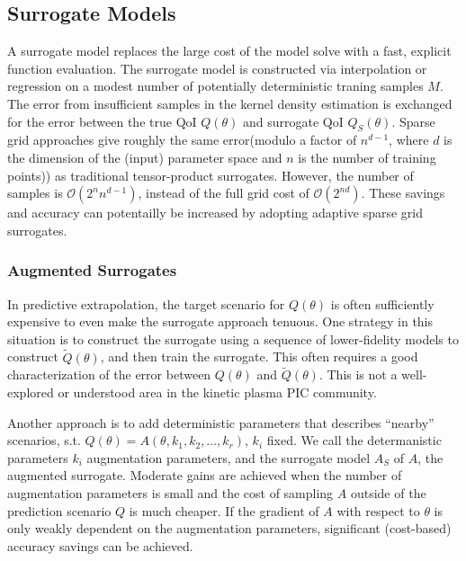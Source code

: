 \documentclass{article}
\begin{document}
\subsection{Surrogate Models}

A surrogate model replaces the large cost of the model solve 
with a fast, explicit function evaluation.  The surrogate model
is constructed via interpolation or regression on a modest number 
of potentially deterministic traning samples $M$.  The
error from insufficient samples in the kernel density estimation is exchanged for the error between the true QoI $Q(\theta)$ and surrogate QoI $Q_S(\theta)$\cite{butler2013propagation}.
Sparse grid approaches \cite{bungartz2004,Jakeman2011LocalAD} give roughly the same error(modulo a factor of $n^{d-1}$, where $d$ is the dimension of the (input) parameter space and $n$ is the number of
training points)) as traditional tensor-product surrogates.
However, the number of samples is  $\mathcal{O}(2^n n^{d-1})$, instead of the full grid cost of $\mathcal{O}(2^{nd})$.  
These savings and accuracy can potentailly be increased by adopting adaptive sparse grid surrogates\cite{bungartz2004}.

\subsubsection*{Augmented Surrogates}

In predictive extrapolation, the target scenario for $Q(\theta)$ is often sufficiently expensive to even make the surrogate 
approach tenuous.   One strategy in this
situation is to construct the surrogate using a sequence of lower-fidelity models to construct $\tilde{Q}(\theta)$, and then train the surrogate\cite{Pehermulti}.  This often requires
a good characterization of the error between $Q(\theta)$ and $\tilde{Q}(\theta)$.  This is not a well-explored or understood area in the kinetic plasma PIC community.  

Another approach is to add deterministic parameters that describes ``nearby'' scenarios,
s.t. $Q(\theta)=A(\theta,k_1,k_2,\ldots,k_r)$, $k_i$ fixed.  We call the determanistic parameters $k_i$ augmentation parameters, and the surrogate model
$A_S$ of $A$, the augmented surrogate.  Moderate gains are achieved when the number of augmentation parameters is small and the cost of sampling $A$ outside of the prediction
scenario $Q$ is much cheaper.  If the gradient of $A$ with respect to $\theta$ is only weakly dependent on the augmentation parameters, 
significant (cost-based) accuracy savings can be achieved.  
\end{document}
